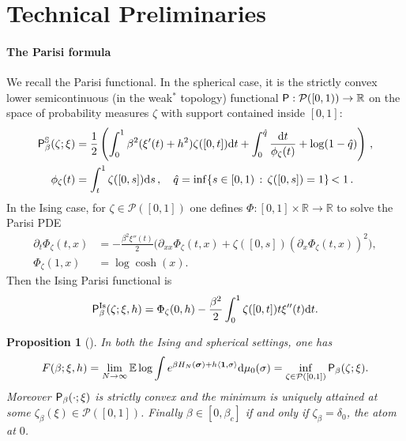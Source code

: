 \documentclass[11pt]{article}
\newtheorem{proposition}[theorem]{Proposition}
\theoremstyle{definition}
\numberwithin{equation}{section}
\def\reals{{\mathbb R}}
\newcommand{\<}{\langle}
\renewcommand{\>}{\rangle}
\def\bsigma{{\boldsymbol{\sigma}}}
\def\bbE{{\mathbb{E}}}
\def\cP{{\mathcal{P}}}
\def\Par{{\sf P}}
\def\de{{\rm d}}
\def\la{\langle}
\def\ra{\rangle}
\def\Is{\mathrm{Is}}
\newcommand{\Sph}{\mathbb{S}}
\def\one{{\mathbf{1}}}
\begin{document}
\section{Technical Preliminaries}
\label{sec:preliminaries}

\paragraph{The Parisi formula}
We recall the Parisi functional.
In the spherical case, it is the strictly convex lower semicontinuous (in the weak$^*$ topology) functional 
$\Par:\cP([0,1))\to \reals$
on the space of probability measures $\zeta$ with support contained inside $[0,1]$:
%
\begin{align}
\label{eq:CrisantiSommers}
\Par^{\Sph}_{\beta}(\zeta;\xi) 
&=
\frac{1}{2}\left(\int_{0}^1 \beta^2(\xi'(t)+h^2)
\zeta([0,t])
\de t 
+
\int_0^{\hat{q}} \frac{\de t}{\phi_{\zeta}(t)}  +\log(1-\hat{q})\right)\, ,
\\
\nonumber
\phi_{\zeta}(t) & = \int_{t}^1\zeta([0,s])\de s\, ,~~~ \hat{q} = \inf\{s\in [0,1) \, :\, \zeta([0,s])=1\}{\,<1}\, .
%
\end{align}
In the Ising case, for $\zeta\in\cP([0,1])$ one defines $\Phi:[0,1]\times\reals\to\reals$ to solve the Parisi PDE
\begin{equation}
\label{eq:Parisi-PDE}
\begin{aligned}
\partial_t \Phi_{\zeta}(t,x)
&=
-\frac{\beta^2 \xi''(t)}{2}\Big(
\partial_{xx}\Phi_{\zeta}(t,x)+\zeta([0,s])(\partial_x \Phi_{\zeta}(t,x))^2
\Big),
\\
\Phi_{\zeta}(1,x)
&=
\log\cosh(x).
\end{aligned}
\end{equation}
Then the Ising Parisi functional is
\[
\Par^{\Is}_{\beta}(\zeta;\xi,h) 
=
\Phi_{\zeta}(0,h)-\frac{\beta^2}{2}\int_0^1 \zeta([0,t])t\xi''(t)\de t.
\]



\begin{proposition}[\cite{talagrand2006parisi-b,auffinger2015parisi}]
\label{prop:parisi-formula}
In both the Ising and spherical settings, one has 
\[
F(\beta;\xi,h)
=
\lim_{N\to\infty}
\bbE
\log 
\int 
e^{\beta H_N(\bsigma)+h\la \one,\sigma\ra}
\de\mu_0(\sigma) = 
\inf_{\zeta\in\cP([0,1])}
\Par_{\beta}(\zeta;\xi).
\]
Moreover $\Par_{\beta}(\cdot;\xi)$ is strictly convex and the minimum is uniquely attained at some $\zeta_{\beta}(\xi)\in\cP([0,1])$.
Finally $\beta\in [0,\beta_c]$ if and only if $\zeta_{\beta}=\delta_0$, the atom at $0$.
\end{proposition}
\end{document}
